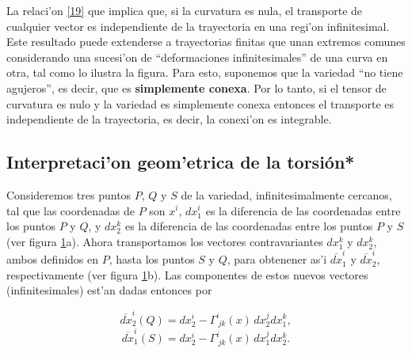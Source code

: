 La relaci'on \eqref{19} que implica que, si la curvatura es nula, el transporte de cualquier vector es independiente de la trayectoria en una regi'on infinitesimal. Este resultado puede extenderse a trayectorias finitas que unan extremos comunes considerando una sucesi'on de ``deformaciones infinitesimales'' de una curva en otra, tal como lo ilustra la figura. Para esto, suponemos que la variedad ``no tiene agujeros'', es decir, que es \textbf{simplemente conexa}. Por lo tanto, si el tensor de curvatura es nulo y la variedad es simplemente conexa entonces el transporte es independiente de la trayectoria, es decir, la conexi'on es integrable.

\subsection{Interpretaci'on geom'etrica de la torsi\'on*}
Consideremos tres puntos $P$, $Q$ y $S$ de la variedad, infinitesimalmente
cercanos, tal que las coordenadas de $P$ son $x^i $, $dx_1^i $ es la
diferencia de las coordenadas entre los puntos $P$ y $Q$, y $dx_2^k $ es la
diferencia de las coordenadas entre los puntos $P$ y $S$ (ver figura \ref{fig:torsion}a). 
Ahora transportamos los vectores contravariantes $dx_1^k $ y $dx_2^k $, ambos definidos en $P$, hasta los puntos $S$ y $Q$, para obtenener as'i $\overline{dx}^i_1$ y $\overline{dx}^i_2$, respectivamente (ver figura \ref{fig:torsion}b). Las componentes de estos nuevos vectores (infinitesimales) est'an dadas entonces por
\begin{center}
\begin{figure}[H]
\centerline{
\hspace{1cm}}
\caption{}
\label{fig:torsion}
\end{figure}
\end{center}
\begin{equation}
\overline{dx}_2^i (Q)=dx_2^i -\Gamma_{\ jk}^i(x)\, dx_2^j dx_1^k ,
\end{equation}
\begin{equation}
\overline{dx}_1^i (S)=dx_2^i -\Gamma_{\ jk}^i(x)\, dx_1^j dx_2^k .
\end{equation}

